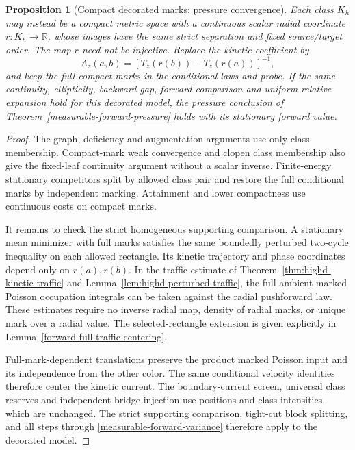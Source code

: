 \documentclass[11pt,reqno]{amsart}
\newtheorem{proposition}[theorem]{Proposition}
\theoremstyle{definition}
\theoremstyle{remark}
\numberwithin{equation}{section}
\newcommand{\R}{\mathbb R}
\begin{document}
\begin{proposition}[Compact decorated marks: pressure convergence]
\label{measurable-forward-decorated}
Each class \(K_h\) may instead be a compact metric space with a continuous
scalar radial coordinate \(r:K_h\to\R\), whose images have the same
strict separation and fixed source/target order. The map \(r\) need
not be injective. Replace the kinetic coefficient by
\[
           A_z(a,b)=[T_z(r(b))-T_z(r(a))]^{-1},
\]
and keep the full compact marks in the conditional laws and probe.
If the same continuity, ellipticity, backward gap, forward comparison
and uniform relative expansion hold for this decorated model, the
pressure conclusion of Theorem~\ref{measurable-forward-pressure}
holds with its stationary forward value.
\end{proposition}
\begin{proof}
The graph, deficiency and augmentation arguments use only class
membership. Compact-mark weak convergence and clopen class membership
also give the fixed-leaf continuity argument without a scalar inverse.
Finite-energy stationary competitors split by allowed class pair and
restore the full conditional marks by independent marking.
Attainment and lower compactness use continuous costs on compact marks.

It remains to check the strict homogeneous supporting comparison.
A stationary mean minimizer with full marks satisfies the same boundedly
perturbed two-cycle inequality on each allowed rectangle.
Its kinetic trajectory and phase coordinates depend only on
\(r(a),r(b)\). In the traffic estimate of
Theorem~\ref{thm:highd-kinetic-traffic} and
Lemma~\ref{lem:highd-perturbed-traffic}, the full ambient marked
Poisson occupation integrals can be taken against the radial
pushforward law. These estimates require no inverse radial map,
density of radial marks, or unique mark over a radial value.
The selected-rectangle extension is given explicitly in
Lemma~\ref{forward-full-traffic-centering}.

Full-mark-dependent translations preserve the product marked Poisson
input and its independence from the other color. The same conditional
velocity identities therefore center the kinetic current.
The boundary-current screen, universal class reserves and independent
bridge injection use positions and class intensities, which are
unchanged. The strict supporting comparison, tight-cut block splitting,
and all steps through \eqref{measurable-forward-variance}
therefore apply to the decorated model.
\end{proof}
\end{document}
